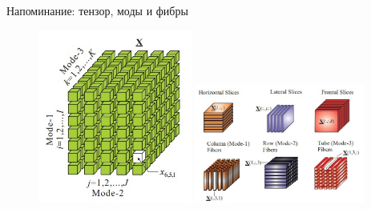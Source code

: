 \begin{frame}{Напоминание: тензор, моды и фибры }

\begin{figure}
    \centering
    \includegraphics[width=0.45\textwidth]{lecture_11/figs/tensor_fibers_1.png}
    \includegraphics[width=0.5\textwidth]{lecture_11/figs/tensor_fibers_2.png}
\end{figure}

\end{frame}


